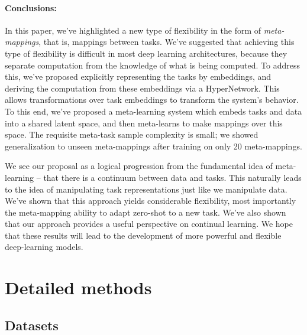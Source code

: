 \documentclass{article}
\begin{document}
\paragraph{Conclusions:} In this paper, we've highlighted a new type of flexibility in the form of \emph{meta-mappings}, that is, mappings between tasks. We've suggested that achieving this type of flexibility is difficult in most deep learning architectures, because they separate computation from the knowledge of what is being computed. To address this, we've proposed explicitly representing the tasks by embeddings, and deriving the computation from these embeddings via a HyperNetwork. This allows transformations over task embeddings to transform the system's behavior. To this end, we've proposed a meta-learning system which embeds tasks and data into a shared latent space, and then meta-learns to make mappings over this space. The requisite meta-task sample complexity is small; we showed generalization to unseen meta-mappings after training on only 20 meta-mappings.\par
We see our proposal as a logical progression from the fundamental idea of meta-learning -- that there is a continuum between data and tasks. This naturally leads to the idea of manipulating task representations just like we manipulate data. We've shown that this approach yields considerable flexibility, most importantly the meta-mapping ability to adapt zero-shot to a new task. We've also shown that our approach provides a useful perspective on continual learning. We hope that these results will lead to the development of more powerful and flexible deep-learning models. \par




\newpage
\appendix

\section{Detailed methods} \label{app_detailed_methods}
\subsection{Datasets}
\end{document}
